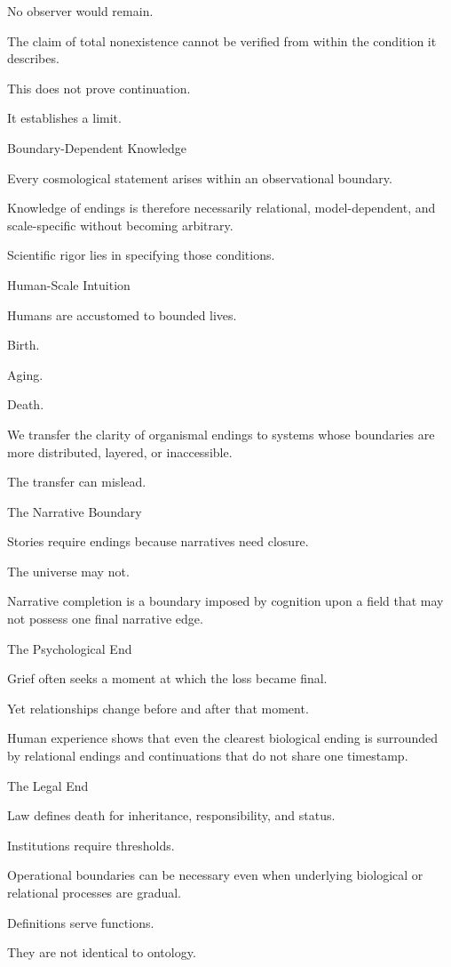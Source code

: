 No observer would remain.

The claim of total nonexistence cannot be verified from within the condition it describes.

This does not prove continuation.

It establishes a limit.

Boundary-Dependent Knowledge

Every cosmological statement arises within an observational boundary.

Knowledge of endings is therefore necessarily relational, model-dependent, and scale-specific without becoming arbitrary.

Scientific rigor lies in specifying those conditions.

Human-Scale Intuition

Humans are accustomed to bounded lives.

Birth.

Aging.

Death.

We transfer the clarity of organismal endings to systems whose boundaries are more distributed, layered, or inaccessible.

The transfer can mislead.

The Narrative Boundary

Stories require endings because narratives need closure.

The universe may not.

Narrative completion is a boundary imposed by cognition upon a field that may not possess one final narrative edge.

The Psychological End

Grief often seeks a moment at which the loss became final.

Yet relationships change before and after that moment.

Human experience shows that even the clearest biological ending is surrounded by relational endings and continuations that do not share one timestamp.

The Legal End

Law defines death for inheritance, responsibility, and status.

Institutions require thresholds.

Operational boundaries can be necessary even when underlying biological or relational processes are gradual.

Definitions serve functions.

They are not identical to ontology.

